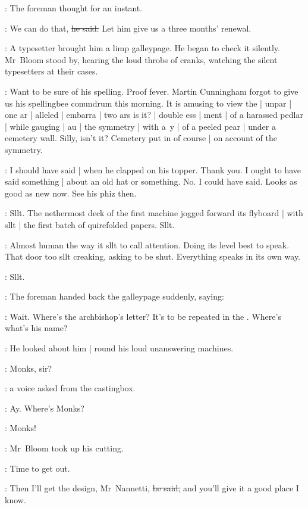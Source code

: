 :
The foreman thought for an instant.

\foreman:
We can do that,
\sout{he said.}
Let him give us a three months' renewal.

:
A typesetter brought him a limp galleypage.
He began to check it silently.
Mr~Bloom stood by,
hearing the loud throbs of cranks,
watching the silent typesetters at their cases.



\BloomInt:
Want to be sure of his spelling.
Proof fever.
Martin Cunningham forgot to give us his spellingbee conundrum this morning.
It is amusing to view the |
unpar |
one ar |
alleled |
embarra |
two ars is it? |
double ess |
ment |
of a harassed pedlar |
while gauging |
au |
the symmetry |
with a~y |
of a peeled pear |
under a cemetery wall.
Silly, isn't it?
Cemetery put in of course |
on account of the symmetry.%

\BloomInt:
I should have said |
when he clapped on his topper.
Thank you.
I ought to have said something |
about an old hat or something.
No.
I could have said.
Looks as good as new now.
See his phiz then.

:
Sllt.
The nethermost deck of the first machine
jogged forward its flyboard |
with sllt |
the first batch of quirefolded papers.
Sllt.

\BloomInt:
Almost human the way it sllt to call attention.
Doing its level best to speak.
That door too sllt creaking, asking to be shut.
Everything speaks in its own way.

:
Sllt.




:
The foreman handed back the galleypage suddenly,
saying:

\foreman:
Wait.
Where's the archbishop's letter?
It's to be repeated in the .
Where's what's his name?

:
He looked about him |
round his loud unanswering machines.

\voice:
Monks, sir?

:
a voice asked from the castingbox.

\foreman:
Ay.
Where's Monks?

\foreman:
Monks!

:
Mr~Bloom took up his cutting.

\BloomInt:
Time to get out.

\Bloom:
Then I'll get the design, Mr~Nannetti,
\sout{he said,}
and you'll give it a good place I know.

